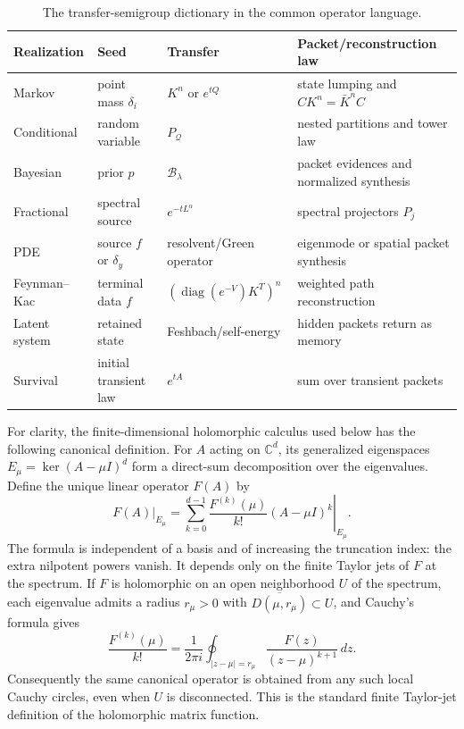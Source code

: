\documentclass[11pt]{article}
\theoremstyle{definition}
\theoremstyle{remark}
\newcommand{\cB}{\mathcal B}
\newcommand{\diag}{\operatorname{diag}}
\begin{document}
\begin{table}[htbp]
\centering
\small
\begin{tabularx}{\textwidth}{L{0.17\textwidth} L{0.19\textwidth} Y Y}
\toprule
Realization & Seed & Transfer & Packet/reconstruction law\\
\midrule
Markov & point mass $\delta_i$ & $K^n$ or $e^{tQ}$ & state lumping and $CK^n=\bar K^nC$\\
Conditional & random variable & $P_{\mathcal Q}$ & nested partitions and tower law\\
Bayesian & prior $p$ & $\cB_\lambda$ & packet evidences and normalized synthesis\\
Fractional & spectral source & $e^{-tL^\alpha}$ & spectral projectors $P_j$\\
PDE & source $f$ or $\delta_y$ & resolvent/Green operator & eigenmode or spatial packet synthesis\\
Feynman--Kac & terminal data $f$ & $(\diag(e^{-V})K^T)^n$ & weighted path reconstruction\\
Latent system & retained state & Feshbach/self-energy & hidden packets return as memory\\
Survival & initial transient law & $e^{tA}$ & sum over transient packets\\
\bottomrule
\end{tabularx}
\caption{The transfer-semigroup dictionary in the common operator language.}
\label{tab:dictionary}
\end{table}

For clarity, the finite-dimensional holomorphic calculus used below has the
following canonical definition. For $A$ acting on $\mathbb C^d$, its generalized
eigenspaces $E_\mu=\ker(A-\mu I)^d$ form a direct-sum decomposition over the
eigenvalues. Define the unique linear operator $F(A)$ by
\[
\left.F(A)\right|_{E_\mu}
=\left.\sum_{k=0}^{d-1}\frac{F^{(k)}(\mu)}{k!}(A-\mu I)^k\right|_{E_\mu}.
\]
The formula is independent of a basis and of increasing the truncation index:
the extra nilpotent powers vanish. It depends only on the finite Taylor jets of
$F$ at the spectrum. If $F$ is holomorphic on an open neighborhood $U$ of the
spectrum, each eigenvalue admits a radius $r_\mu>0$ with
$\overline{D(\mu,r_\mu)}\subset U$, and Cauchy's formula gives
\[
\frac{F^{(k)}(\mu)}{k!}
=\frac{1}{2\pi i}\oint_{|z-\mu|=r_\mu}
  \frac{F(z)}{(z-\mu)^{k+1}}\,dz.
\]
Consequently the same canonical operator is obtained from any such local
Cauchy circles, even when $U$ is disconnected. This is the standard finite
Taylor-jet definition of the holomorphic matrix function.
\end{document}
